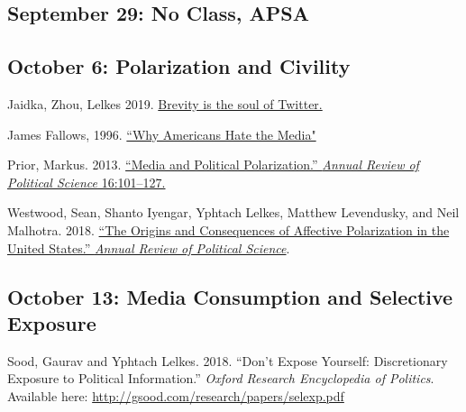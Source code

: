 \vspace{-.1in}\documentclass[11pt]{article}
\begin{document}
\subsection*{September 29: No Class, APSA}

\subsection*{October 6: Polarization and Civility}


Jaidka, Zhou, Lelkes 2019.  \href{https://github.com/kmunger/MSMP21/blob/main/yph.pdf}{Brevity is the soul of Twitter. }



\noindent James Fallows, 1996. \href{https://www.theatlantic.com/magazine/archive/1996/02/why-americans-hate-the-media/305060/}{``Why Americans Hate the Media"}


\noindent Prior, Markus. 2013. \href{https://github.com/kmunger/MSMP21/blob/main/prior.pdf}{``Media and Political Polarization.'' \emph{Annual Review of Political Science} 16:101--127.}

\noindent Westwood, Sean, Shanto Iyengar, Yphtach Lelkes, Matthew Levendusky, and Neil Malhotra. 2018. \href{https://github.com/kmunger/MSMP21/blob/main/prior.pdf}{ ``The Origins and Consequences of Affective Polarization in the United States.'' \emph{Annual Review of Political Science}}.










\subsection*{October 13: Media Consumption and Selective Exposure}





\noindent Sood, Gaurav and Yphtach Lelkes. 2018. ``Don't Expose Yourself: Discretionary Exposure to Political Information.'' \emph{Oxford Research Encyclopedia of Politics}. Available here: \url{http://gsood.com/research/papers/selexp.pdf}
\end{document}
